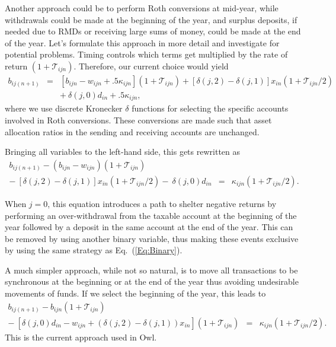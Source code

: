 \documentclass{report}[fleqn,12pt]
\begin{document}
	Another approach could be to perform Roth conversions at mid-year, while withdrawals
	could be made at the beginning of the year, and surplus deposits,
	if needed due to RMDs or receiving large sums of money,
	could be made at the end of the year. Let's formulate this approach
	in more detail and investigate for potential problems.
	Timing controls which terms get multiplied by the rate of return $(1 + \mathcal{T}_{ijn})$.
	Therefore, our current choice would yield
	\begin{eqnarray}
		\label{Eq:C3a}
		b_{ij(n+1)} &=& [b_{ijn} - w_{ijn} + .5\kappa_{ijn}](1 + \mathcal{T}_{ijn})
		+ [\delta(j, 2) - \delta(j, 1)]x_{in} (1 + \mathcal{T}_{ijn}/2)
		\nonumber \\
		&& 
		+\ \delta(j, 0) d_{in} + .5 \kappa_{ijn},
	\end{eqnarray}
	where we use discrete Kronecker $\delta$ functions for selecting the specific accounts involved
	in Roth conversions. These conversions are made such that asset allocation
	ratios in the sending and receiving accounts are unchanged.

	Bringing all variables
	to the left-hand side, this gets rewritten as
	\begin{eqnarray}
		\label{Eq:C3}
		b_{ij(n+1)} - (b_{ijn} - w_{ijn}) (1 + \mathcal{T}_{ijn})
		&& \nonumber \\
		-\ [\delta(j, 2) - \delta(j, 1)]x_{in}(1 + \mathcal{T}_{ijn}/2)
		-\ \delta(j, 0) d_{in}
		&=& \kappa_{ijn} (1 + \mathcal{T}_{ijn}/2).
	\end{eqnarray}

	When $j=0$, this equation introduces
	a path to shelter negative returns by performing an over-withdrawal from the taxable
	account at the beginning of the year followed by a deposit in the
	same account at the end of the year. This can 
	be removed by using another binary variable, thus making these events exclusive by using
	the same strategy as Eq.~(\ref{Eq:Binary}).

	A much simpler approach, while not so natural,
	is to move all transactions to be synchronous at the beginning or at the end of the year
	thus avoiding undesirable movements of funds.
	If we select the beginning of the year, this leads to
	\begin{eqnarray}
		\label{Eq:C3b}
		b_{ij(n+1)} - b_{ijn}(1 + \mathcal{T}_{ijn}) 
		&& \nonumber \\
		- \ [\delta(j, 0)d_{in} - w_{ijn} + (\delta(j, 2) - \delta(j, 1))x_{in}] (1 + \mathcal{T}_{ijn})
		&=& \kappa_{ijn} (1 + \mathcal{T}_{ijn}/2).
	\end{eqnarray}
	This is the current approach used in Owl.
\end{document}
